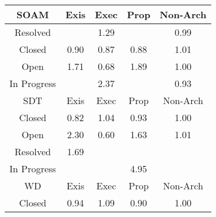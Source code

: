 \begin{tabular}{|c||c|c|c|c|}
\hline
\hline
SOAM & Exis & Exec & Prop & Non-Arch \\ 
\hline
Resolved &  & \cellcolor[rgb]{0.8958890301659784,0.8333158563944109,0.42} 1.29 &  & \cellcolor[rgb]{0.9074956944843902,0.8281462872261137,0.41766264818543086} 0.99 \\ 
\hline
Closed & \cellcolor[rgb]{0.8910020031697031,0.7500761483365946,0.4022685362917229} 0.90 & \cellcolor[rgb]{0.8848822477875937,0.7211093061946102,0.39655676460175415} 0.87 & \cellcolor[rgb]{0.8861183425771042,0.7269601548649594,0.3977104530719638} 0.88 & \cellcolor[rgb]{0.9096526174879184,0.839835450389014,0.42} 1.01 \\ 
\hline
Open & \cellcolor[rgb]{0.8750579812884933,0.8234485174524442,0.42} 1.71 & \cellcolor[rgb]{0.8487552308430067,0.5501080926568982,0.3628382154534729} 0.68 & \cellcolor[rgb]{0.8664445276456423,0.8193684604637251,0.42} 1.89 & \cellcolor[rgb]{0.9097547954501128,0.8398838504763692,0.42} 1.00 \\ 
\hline
In Progress &  & \cellcolor[rgb]{0.8425536862872088,0.8080517461360462,0.42} 2.37 &  & \cellcolor[rgb]{0.8957512773162324,0.7725560459634997,0.4067011921618168} 0.93 \\ 
\hline
\hline
SDT & Exis & Exec & Prop & Non-Arch \\ 
\hline
Closed & \cellcolor[rgb]{0.8743780861802137,0.6713896079196782,0.3867528804348661} 0.82 & \cellcolor[rgb]{0.9082457901265408,0.839169058480993,0.42} 1.04 & \cellcolor[rgb]{0.8965312075745043,0.7762477158526536,0.4074291270695373} 0.93 & \cellcolor[rgb]{0.9098981738893206,0.8395180230761172,0.41990496229669916} 1.00 \\ 
\hline
Open & \cellcolor[rgb]{0.8462708073468553,0.8098124876906155,0.41999999999999993} 2.30 & \cellcolor[rgb]{0.8336798026755662,0.47875106599767986,0.3487678158305284} 0.60 & \cellcolor[rgb]{0.878968122442953,0.8253006895782409,0.42} 1.63 & \cellcolor[rgb]{0.9096045335933386,0.8398126738073709,0.42} 1.01 \\ 
\hline
Resolved & \cellcolor[rgb]{0.8762926804851938,0.8240333749666706,0.41999999999999993} 1.69 &  &  &  \\ 
\hline
In Progress &  &  & \cellcolor[rgb]{0.7161805227376236,0.748190773928348,0.42} 4.95 &  \\ 
\hline
\hline
WD & Exis & Exec & Prop & Non-Arch \\ 
\hline
Closed & \cellcolor[rgb]{0.899021244188496,0.7880338891588813,0.4097531612425963} 0.94 & \cellcolor[rgb]{0.9056093391198207,0.8379202132672834,0.42} 1.09 & \cellcolor[rgb]{0.889884156629521,0.7447850080463995,0.40122521285421964} 0.90 & \cellcolor[rgb]{0.9091650117628234,0.8360477223440305,0.4192206776453018} 1.00 \\ 

\end{tabular}
